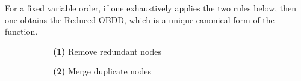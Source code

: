 \documentclass[english, aspectratio=169]{beamer}
\begin{document}
\begin{frame}
  \begin{theorem}[Bryant '86]
    For a fixed variable order, if one exhaustively applies the two rules below,
    then one obtains the Reduced OBDD, which is a unique canonical form of the
    function.    
  \end{theorem}

  \begin{figure}
    \centering
    
    \begin{subfigure}[b]{0.40\linewidth}
      \centering

      \begin{tikzpicture}[scale=0.9, every node/.style={transform shape}]
        
      \end{tikzpicture}

      \vspace{10pt}
      {\small {\bf (1)} Remove redundant nodes}
    \end{subfigure}
    \begin{subfigure}[b]{0.59\linewidth}
      \centering

      \begin{tikzpicture}[scale=0.9, every node/.style={transform shape}]
        
      \end{tikzpicture}

      \vspace{10pt}
      {\small {\bf (2)} Merge duplicate nodes}
    \end{subfigure}

  \end{figure}
  
\end{frame}

\blankframe
\end{document}
